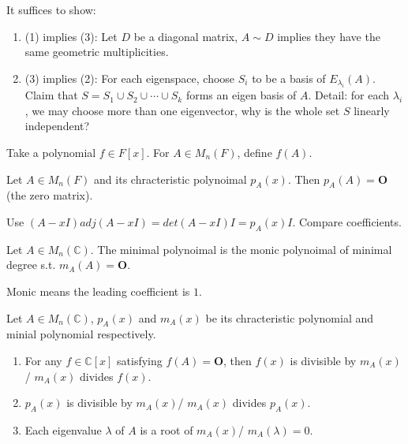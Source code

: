 \documentclass[12pt]{article}
\begin{document}
\begin{pfbox}
    It suffices to show:
    \begin{enumerate}
        \item (1) implies (3): Let $D$ be a diagonal matrix, $A\sim D$ implies they have the same geometric multiplicities.
        \item (3) implies (2): For each eigenspace, choose $S_i$ to be a basis of $E_{\lambda_i}(A)$. Claim that $S=S_1\cup S_2\cup\cdots\cup S_k$ forms an eigen basis of $A$. Detail: for each $\lambda_i$, we may choose more than one eigenvector, why is the whole set $S$ linearly independent?
    \end{enumerate}
\end{pfbox}




\begin{exercise}
    Take a polynomial $f\in F[x]$. For $A\in M_n(F)$, define $f(A)$.
\end{exercise}


\begin{theorem}
    Let $A\in M_n(F)$ and its chracteristic polynoimal $p_A(x)$.
    Then $p_A(A)=\mathbf{O}$ (the zero matrix). 
\end{theorem}

\begin{pfbox}
    Use $(A-xI)adj(A-xI)=det(A-xI)I=p_A(x)I$. Compare coefficients.
\end{pfbox}



\begin{definition}
    Let $A\in M_n(\mathbb{C})$. The minimal polynoimal is the monic polynoimal of minimal degree s.t. $m_A(A)=\mathbf{O}$.
\end{definition}

Monic means the leading coefficient is $1$.

\begin{theorem}
     Let $A\in M_n(\mathbb{C})$, $p_A(x)$ and $m_A(x)$ be its chracteristic polynomial and minial polynomial respectively.
     \begin{enumerate}
        \item For any $f\in\mathbb{C}[x]$ satisfying $f(A)=\mathbf{O}$, then $f(x)$ is divisible by $m_A(x)$/ $m_A(x)$ divides $f(x)$.
        \item $p_A(x)$ is divisible by $m_A(x)$/ $m_A(x)$ divides $p_A(x)$.
        \item Each eigenvalue $\lambda$ of $A$ is a root of $m_A(x)$/ $m_A(\lambda)=0$.
     \end{enumerate}
     \label{thm_6.9}
\end{theorem}
\end{document}
